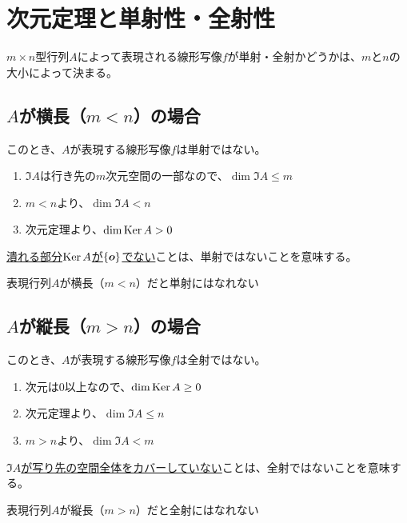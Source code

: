 \documentclass[../../../topic_linear-algebra]{subfiles}
\begin{document}
\sectionline
\section{次元定理と単射性・全射性}

$m \times n$型行列$A$によって表現される線形写像$f$が単射・全射かどうかは、$m$と$n$の大小によって決まる。

\subsection{$A$が横長（$m < n$）の場合}

このとき、$A$が表現する線形写像$f$は単射ではない。

\begin{enumerate}
  \item $\Im A$は行き先の$m$次元空間の一部なので、$\dim \Im A \leq m$
  \item $m < n$より、$\dim \Im A < n$
  \item 次元定理より、$\dim \operatorname{Ker} A > 0$
\end{enumerate}

\hyperref[sec:injectivity-condition-kernel]{潰れる部分$\operatorname{Ker} A$が$\{ \vb*{o} \}$でない}ことは、単射ではないことを意味する。

\begin{emphabox}
  \begin{spacebox}
    \begin{center}
      表現行列$A$が横長（$m < n$）だと単射にはなれない
    \end{center}
  \end{spacebox}
\end{emphabox}

\subsection{$A$が縦長（$m > n$）の場合}

このとき、$A$が表現する線形写像$f$は全射ではない。

\begin{enumerate}
  \item 次元は$0$以上なので、$\dim \operatorname{Ker} A \geq 0$
  \item 次元定理より、$\dim \Im A \leq n$
  \item $m > n$より、$\dim \Im A < m$
\end{enumerate}

\hyperref[sec:image-and-surjectivity]{$\Im A$が写り先の空間全体をカバーしていない}ことは、全射ではないことを意味する。

\begin{emphabox}
  \begin{spacebox}
    \begin{center}
      表現行列$A$が縦長（$m > n$）だと全射にはなれない
    \end{center}
  \end{spacebox}
\end{emphabox}
\end{document}
